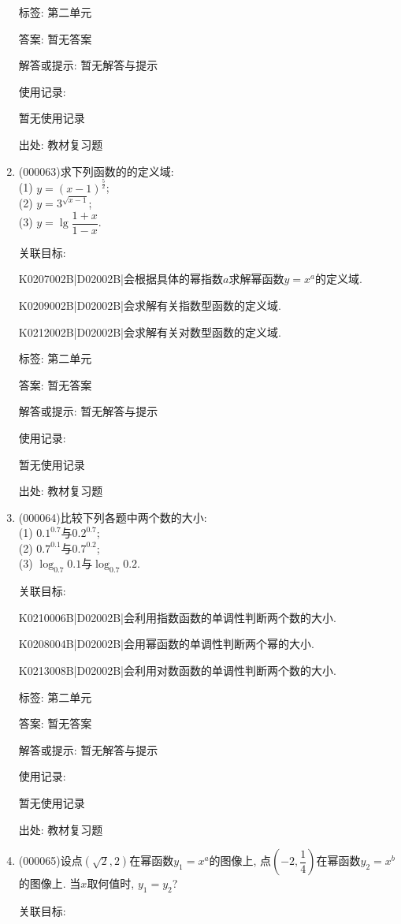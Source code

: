 \documentclass[10pt,a4paper]{article}
\begin{document}
\begin{enumerate}[1.]
标签: 第二单元

答案: 暂无答案

解答或提示: 暂无解答与提示

使用记录:

暂无使用记录


出处: 教材复习题
\item { (000063)}求下列函数的的定义域:\\
(1) $y=(x-1)^{\frac 52}$;\\
(2) $y=3^{\sqrt{x-1}}$;\\
(3) $y=\lg \dfrac{1+x}{1-x}$.


关联目标:

K0207002B|D02002B|会根据具体的幂指数$a$求解幂函数$y=x^{a}$的定义域.

K0209002B|D02002B|会求解有关指数型函数的定义域.

K0212002B|D02002B|会求解有关对数型函数的定义域.



标签: 第二单元

答案: 暂无答案

解答或提示: 暂无解答与提示

使用记录:

暂无使用记录


出处: 教材复习题
\item { (000064)}比较下列各题中两个数的大小:\\
(1) $0.1^{0.7}$与$0.2^{0.7}$;\\
(2) $0.7^{0.1}$与$0.7^{0.2}$;\\
(3) $\log_{0.7}0.1$与$\log_{0.7}0.2$.


关联目标:

K0210006B|D02002B|会利用指数函数的单调性判断两个数的大小.

K0208004B|D02002B|会用幂函数的单调性判断两个幂的大小.

K0213008B|D02002B|会利用对数函数的单调性判断两个数的大小.



标签: 第二单元

答案: 暂无答案

解答或提示: 暂无解答与提示

使用记录:

暂无使用记录


出处: 教材复习题
\item { (000065)}设点$(\sqrt 2, 2)$在幂函数$y_1=x^a$的图像上, 点$(-2,\dfrac 14)$在幂函数$y_2=x^b$的图像上. 当$x$取何值时, $y_1=y_2$?


关联目标:


\end{enumerate}
\end{document}
